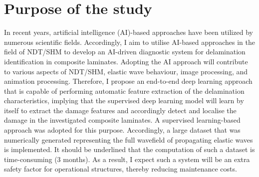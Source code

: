 \section{Purpose of the study}
\label{sec12}
In recent years, artificial intelligence (AI)-based approaches have been utilized by numerous scientific fields.
Accordingly, I aim to utilise AI-based approaches in the field of NDT/SHM to develop an AI-driven diagnostic system for delamination identification in composite laminates.
Adopting the AI approach will contribute to various aspects of NDT/SHM, elastic wave behaviour, image processing, and animation processing.
Therefore, I propose an end-to-end deep learning approach that is capable of performing automatic feature extraction of the delamination characteristics, implying that the supervised deep learning model will learn by itself to extract the damage features and accordingly detect and localise the damage in the investigated composite laminates.
A supervised learning-based approach was adopted for this purpose.
Accordingly, a large dataset that was numerically generated representing the full wavefield of propagating elastic waves is implemented.
It should be underlined that the computation of such a dataset is time-consuming (3 months).
As a result, I expect such a system will be an extra safety factor for operational structures, thereby reducing maintenance costs.
